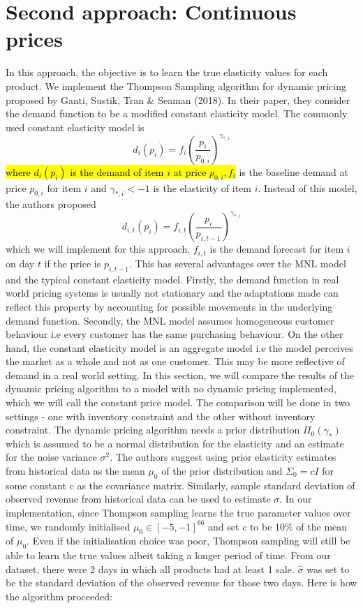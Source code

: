 \documentclass[a4paper]{article}
\begin{document}
\section{Second approach: Continuous prices}
In this approach, the objective is to learn the true elasticity values for each product. We implement the Thompson Sampling algorithm for dynamic pricing proposed by Ganti, Sustik, Tran \& Seaman (2018). In their paper, they consider the demand function to be a modified constant elasticity model. The commonly used constant elasticity model is 
\[d_i(p_i) = f_i \left(\frac{p_i}{p_{0,i}}\right)^{\gamma_{*,i}} \]
\hl{where $d_i(p_i)$ is the demand of item $i$ at price $p_{0,i}, f_i$ } is the baseline demand at price $p_{0,i}$ for item $i$ and $\gamma_{*,i} < -1$ is the elasticity of item $i$. Instead of this model, the authors proposed 
\[d_{i,t}(p_i) = f_{i,t} \left(\frac{p_i}{p_{i,t-1}}\right)^{\gamma_{*,i}} \]
which we will implement for this approach. $f_{i,t}$ is the demand forecast for item $i$ on day $t$ if the price is $p_{i,t-1}$. This has several advantages over the MNL model and the typical constant elasticity model. Firstly, the demand function in real world pricing systems is usually not stationary and the adaptations made can reflect this property by accounting for possible movements in the underlying demand function. Secondly, the MNL model assumes homogeneous customer behaviour i.e every customer has the same purchasing behaviour. On the other hand, the constant elasticity model is an aggregate model i.e the model perceives the market as a whole and not as one customer. This may be more reflective of demand in a real world setting.
\newline
\newline
In this section, we will compare the results of the dynamic pricing algorithm to a model with no dynamic pricing implemented, which we will call the constant price model. The comparison will be done in two settings - one with inventory constraint and the other without inventory constraint.
\newline
\newline
The dynamic pricing algorithm needs a prior distribution $\Pi_0(\gamma_*)$ which is assumed to be a normal distribution for the elasticity and an estimate for the noise variance $\sigma^2$. The authors suggest using prior elasticity estimates from historical data as the mean $\mu_0$ of the prior distribution and $\Sigma_0 = cI$ for some constant c as the covariance matrix. Similarly, sample standard deviation of observed revenue from historical data can be used to estimate $\sigma$. In our implementation, since Thompson sampling learns the true parameter values over time, we randomly initialised $\mu_0 \in [-5, -1]^{66}$ and set $c$ to be 10\% of the mean of $\mu_0$. Even if the initialisation choice was poor, Thompson sampling will still be able to learn the true values albeit taking a longer period of time. From our dataset, there were 2 days in which all products had at least 1 sale. $\hat{\sigma}$ was set to be the standard deviation of the observed revenue for those two days. Here is how the algorithm proceeded:
\end{document}
